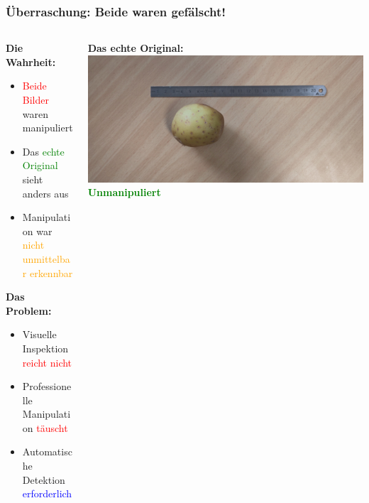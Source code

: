 \documentclass[11pt,t,usepdftitle=false,aspectratio=169]{beamer}
\begin{document}
\begin{frame}
	\frametitle{Überraschung: Beide waren gefälscht!}
	\begin{columns}[T]
		\begin{column}{0.48\textwidth}
			\textbf{Die Wahrheit:}
			\begin{itemize}
				\item \textcolor{red}{Beide Bilder} waren manipuliert
				\item Das \textcolor{green}{echte Original} sieht anders aus
				\item Manipulation war \textcolor{orange}{nicht unmittelbar erkennbar}
			\end{itemize}
			
			\vspace{0.5em}
			\textbf{Das Problem:}
			\begin{itemize}
				\item Visuelle Inspektion \textcolor{red}{reicht nicht}
				\item Professionelle Manipulation \textcolor{red}{täuscht}
				\item Automatische Detektion \textcolor{blue}{erforderlich}
			\end{itemize}
		\end{column}
		\begin{column}{0.48\textwidth}
			\centering
			\textbf{Das echte Original:}
			\vspace{0.5em}
			\includegraphics[width=\textwidth]{images/image_2.jpg}
			\vspace{0.5em}
			\textcolor{green}{\textbf{Unmanipuliert}}
		\end{column}
	\end{columns}
\end{frame}
\end{document}
